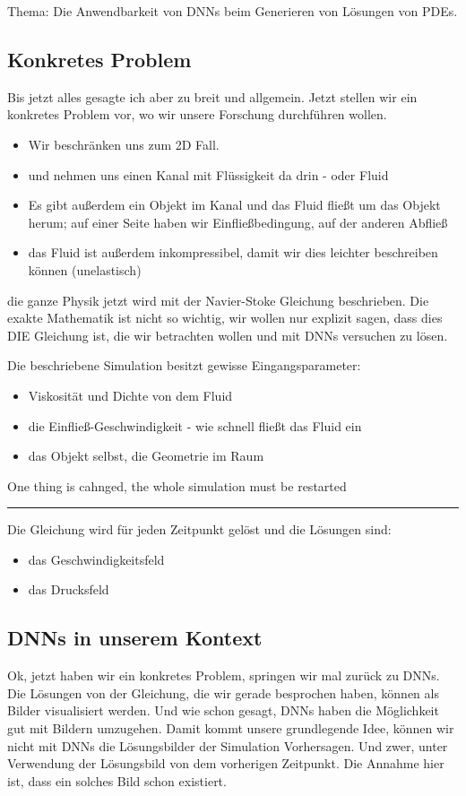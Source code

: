 \documentclass[margin=0.05in, tmargin=0.01in]{article}
\begin{document}
Thema: Die Anwendbarkeit von DNNs beim Generieren von Lösungen von PDEs.


\subsection{Konkretes Problem}
\label{sec:org8d4f92d}
Bis jetzt alles gesagte ich aber zu breit und allgemein. Jetzt stellen wir ein konkretes Problem vor, wo wir unsere Forschung durchführen wollen.

\begin{itemize}
\item Wir beschränken uns zum 2D Fall.
\item und nehmen uns einen Kanal mit Flüssigkeit da drin - oder Fluid
\item Es gibt außerdem ein Objekt im Kanal und das Fluid fließt um das Objekt herum; auf einer Seite haben wir Einfließbedingung, auf der anderen Abfließ
\item das Fluid ist außerdem inkompressibel, damit wir dies leichter beschreiben können (unelastisch)
\end{itemize}

die ganze Physik jetzt wird mit der Navier-Stoke Gleichung beschrieben. Die exakte Mathematik ist nicht so wichtig, wir wollen nur explizit sagen, dass dies DIE Gleichung ist, die wir betrachten wollen und mit DNNs versuchen zu lösen.

Die beschriebene Simulation besitzt gewisse Eingangsparameter:
\begin{itemize}
\item Viskosität und Dichte von dem Fluid
\item die Einfließ-Geschwindigkeit - wie schnell fließt das Fluid ein
\item das Objekt selbst, die Geometrie im Raum
\end{itemize}
One thing is cahnged, the whole simulation must be restarted

\noindent\rule{\textwidth}{0.5pt}

Die Gleichung wird für jeden Zeitpunkt gelöst und die Lösungen sind:
\begin{itemize}
\item das Geschwindigkeitsfeld
\item das Drucksfeld
\end{itemize}


\subsection{DNNs in unserem Kontext}
\label{sec:org69f29ac}
Ok, jetzt haben wir ein konkretes Problem, springen wir mal zurück zu DNNs. Die Lösungen von der Gleichung, die wir gerade besprochen haben, können als Bilder visualisiert werden. Und wie schon gesagt, DNNs haben die Möglichkeit gut mit Bildern umzugehen. Damit kommt unsere grundlegende Idee, können wir nicht mit DNNs die Lösungsbilder der Simulation Vorhersagen. Und zwer, unter Verwendung der Lösungsbild von dem vorherigen Zeitpunkt. Die Annahme hier ist, dass ein solches Bild schon existiert.
\end{document}
